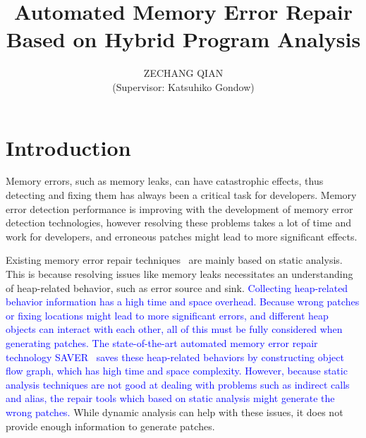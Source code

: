 \documentclass[a4j,dvipdfmx]{article}
\title{Automated Memory Error Repair Based on Hybrid Program Analysis} %
\author{ ZECHANG QIAN \\ (Supervisor:  Katsuhiko Gondow)}
\date{} %
\begin{document}
\maketitle


\section{Introduction}
Memory errors, such as memory leaks, can have catastrophic effects,  thus detecting and fixing them has always been a critical task for developers. Memory error detection performance is improving with the development of memory error detection technologies, however resolving these problems takes a lot of time and work for developers, and erroneous patches might lead to more significant effects.

Existing memory error repair techniques~\cite{SAVER,Memfix} are mainly based on static analysis. This is because resolving issues like memory leaks necessitates an understanding of heap-related behavior, such as error source and sink. \textcolor{blue}{Collecting heap-related behavior information has a high time and space overhead. Because wrong patches or fixing locations might lead to more significant errors, and different heap objects can interact with each other, all of this must be fully considered when generating patches. The state-of-the-art automated memory error repair technology SAVER~\cite{SAVER} saves these heap-related behaviors by constructing object flow graph, which has high time and space complexity. However, because static analysis techniques are not good at dealing with problems such as indirect calls and alias, the repair tools which based on static analysis might generate the wrong patches.} While dynamic analysis can help with these issues, it does not provide enough information to generate patches.
\end{document}
